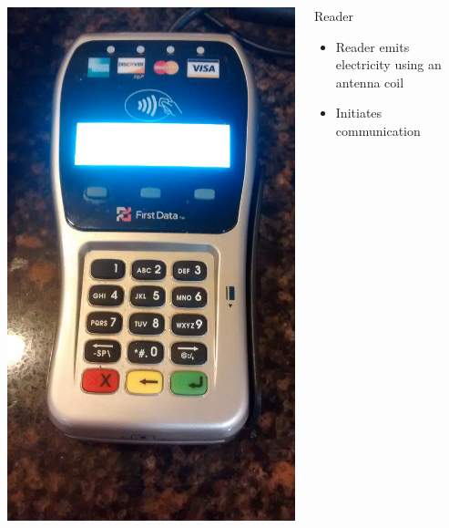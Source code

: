 \documentclass[unknownkeysallowed]{beamer}
\begin{document}
\begin{frame}
  \begin{columns}[T]
    \begin{column}{.5\textwidth}\centering
        \vspace{3mm}
        \includegraphics[width=\linewidth,height=0.2\textheight,keepaspectratio]{figures/higbies.jpg}
    \end{column}
    \begin{column}{.5\textwidth}
      \begin{block}{Reader}
	       \begin{itemize}
          \item{Reader emits electricity using an antenna coil}
          \pause
          \item{Initiates communication}
         \end{itemize}
       \end{block}
    \end{column}
  \end{columns}
\end{frame}
\end{document}
